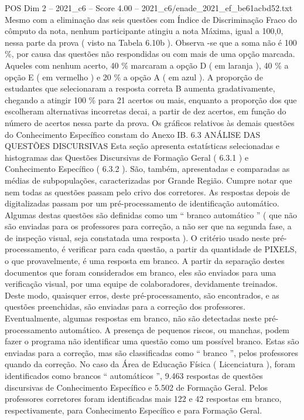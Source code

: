 \begin{textsample}{POS Dim 2 – 2021\_c6 – Score 4.00 – 2021\_c6/enade\_2021\_ef\_be61acbd52.txt}
Mesmo com a eliminação das seis questões com Índice de Discriminação Fraco do cômputo da nota, nenhum participante atingiu a nota Máxima, igual a 100,0, nessa parte da prova ( visto na Tabela 6.10b ).
Observa -se que a soma não é 100 \%, por causa das questões não respondidas ou com mais de uma opção marcada.
Aqueles com nenhum acerto, 40 \% marcaram a opção D ( em laranja ), 40 \% a opção E ( em vermelho ) e 20 \% a opção A ( em azul ).
A proporção de estudantes que selecionaram a resposta correta B aumenta gradativamente, chegando a atingir 100 \% para 21 acertos ou mais, enquanto a proporção dos que escolheram alternativas incorretas decai, a partir de dez acertos, em função do número de acertos nessa parte da prova.
Os gráficos relativos às demais questões do Conhecimento Específico constam do Anexo IB. 6.3 ANÁLISE DAS QUESTÕES DISCURSIVAS Esta seção apresenta estatísticas selecionadas e histogramas das Questões Discursivas de Formação Geral ( 6.3.1 ) e Conhecimento Específico ( 6.3.2 ).
São, também, apresentadas e comparadas as médias de subpopulações, caracterizadas por Grande Região.
Cumpre notar que nem todas as questões passam pelo crivo dos corretores.
As respostas depois de digitalizadas passam por um pré-processamento de identificação automático.
Algumas destas questões são definidas como um “ branco automático ” ( que não são enviadas para os professores para correção, a não ser que na segunda fase, a de inspeção visual, seja constatada uma resposta ).
O critério usado neste pré-processamento, é verificar para cada questão, a partir da quantidade de PIXELS, o que provavelmente, é uma resposta em branco.
A partir da separação destes documentos que foram considerados em branco, eles são enviados para uma verificação visual, por uma equipe de colaboradores, devidamente treinados.
Deste modo, quaisquer erros, deste pré-processamento, são encontrados, e as questões preenchidas, são enviadas para a correção dos professores.
Eventualmente, algumas respostas em branco, não são detectadas neste pré-processamento automático.
A presença de pequenos riscos, ou manchas, podem fazer o programa não identificar uma questão como um possível branco.
Estas são enviadas para a correção, mas são classificadas como “ branco ”, pelos professores quando da correção.
No caso da Área de Educação Física ( Licenciatura ), foram identificados como brancos “ automáticos ”, 9.463 respostas de questões discursivas de Conhecimento Específico e 5.502 de Formação Geral.
Pelos professores corretores foram identificadas mais 122 e 42 respostas em branco, respectivamente, para Conhecimento Específico e para Formação Geral.

\end{textsample}
